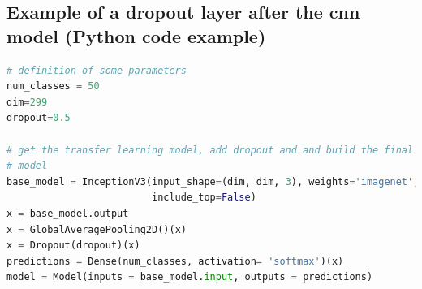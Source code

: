\documentclass[10pt]{article}
\begin{document}
			
			
		\subsection{Example of a dropout layer after the \ac{cnn} model (Python code example)}
			\begin{lstlisting}[frame=single,caption={Example of a dropout layer after the \ac{cnn} model},captionpos=b,basicstyle=\small,language=Python,label=lst:lstlisting_python_dropout]
# definition of some parameters
num_classes = 50
dim=299
dropout=0.5

# get the transfer learning model, add dropout and and build the final
# model
base_model = InceptionV3(input_shape=(dim, dim, 3), weights='imagenet',
                         include_top=False)
x = base_model.output
x = GlobalAveragePooling2D()(x)
x = Dropout(dropout)(x)
predictions = Dense(num_classes, activation= 'softmax')(x)
model = Model(inputs = base_model.input, outputs = predictions)
			\end{lstlisting}
			
			
\end{document}
